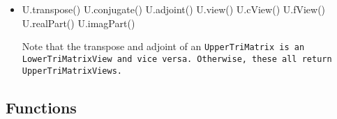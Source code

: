 \begin{itemize}
\item
\begin{tmvcode}
U.transpose()
U.conjugate()
U.adjoint()
U.view()
U.cView()
U.fView()
U.realPart()
U.imagPart()
\end{tmvcode}
Note that the transpose and adjoint of an \tt{UpperTriMatrix} is an
\tt{LowerTriMatrixView} and vice versa.  Otherwise, these all return
\tt{UpperTriMatrixView}s.

\end{itemize}

\subsection{Functions}
\label{TriMatrix_Functions}

